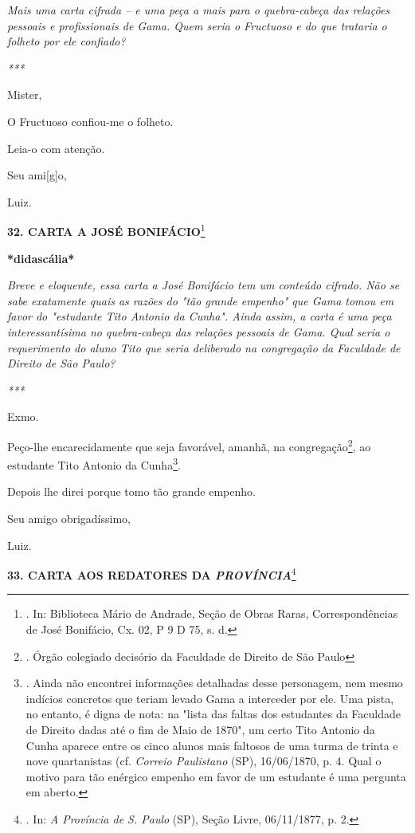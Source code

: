 \emph{Mais uma carta cifrada -- e uma peça a mais para o quebra-cabeça
das relações pessoais e profissionais de Gama. Quem seria o Fructuoso e
do que trataria o folheto por ele confiado? }

\emph{***}

Mister,

O Fructuoso confiou-me o folheto.

Leia-o com atenção.

Seu ami{[}g{]}o,

Luiz.

\textbf{32. CARTA A JOSÉ BONIFÁCIO}\footnote{. In: Biblioteca Mário de
  Andrade, Seção de Obras Raras, Correspondências de José Bonifácio, Cx.
  02, P 9 D 75, s. d.}

\textbf{*didascália*}

\emph{Breve e eloquente, essa carta a José Bonifácio tem um conteúdo
cifrado. Não se sabe exatamente quais as razões do "tão grande empenho"
que Gama tomou em favor do "estudante Tito Antonio da Cunha". Ainda
assim, a carta é uma peça interessantísima no quebra-cabeça das relações
pessoais de Gama. Qual seria o requerimento do aluno Tito que seria
deliberado na congregação da Faculdade de Direito de São Paulo? }

\emph{***}

Exmo.

Peço-lhe encarecidamente que seja favorável, amanhã, na
congregação\footnote{. Órgão colegiado decisório da Faculdade de Direito
  de São Paulo}, ao estudante Tito Antonio da Cunha\footnote{. Ainda não
  encontrei informações detalhadas desse personagem, nem mesmo indícios
  concretos que teriam levado Gama a interceder por ele. Uma pista, no
  entanto, é digna de nota: na "lista das faltas dos estudantes da
  Faculdade de Direito dadas até o fim de Maio de 1870", um certo Tito
  Antonio da Cunha aparece entre os cinco alunos mais faltosos de uma
  turma de trinta e nove quartanistas (cf. \emph{Correio Paulistano}
  (SP), 16/06/1870, p. 4. Qual o motivo para tão enérgico empenho em
  favor de um estudante é uma pergunta em aberto.}.

\protect\hypertarget{Secao_Sem_Titulo-45}{}{}Depois lhe direi porque
tomo tão grande empenho.

Seu amigo obrigadíssimo,

Luiz.

\textbf{33. CARTA AOS REDATORES DA \emph{PROVÍNCIA}}\footnote{. In:
  \emph{A Província de S. Paulo} (SP), Seção Livre, 06/11/1877, p. 2.}

